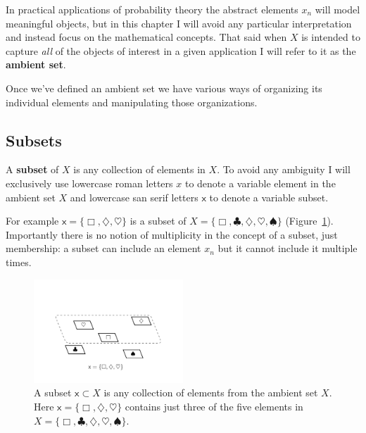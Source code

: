 \documentclass[
  letterpaper,
  DIV=11,
  numbers=noendperiod]{scrartcl}
\begin{document}
In practical applications of probability theory the abstract elements
\(x_{n}\) will model meaningful objects, but in this chapter I will
avoid any particular interpretation and instead focus on the
mathematical concepts. That said when \(X\) is intended to capture
\emph{all} of the objects of interest in a given application I will
refer to it as the \textbf{ambient set}.

Once we've defined an ambient set we have various ways of organizing its
individual elements and manipulating those organizations.

\hypertarget{subsets}{%
\subsection{Subsets}\label{subsets}}

A \textbf{subset} of \(X\) is any collection of elements in \(X\). To
avoid any ambiguity I will exclusively use lowercase roman letters \(x\)
to denote a variable element in the ambient set \(X\) and lowercase san
serif letters \(\mathsf{x}\) to denote a variable subset.

For example \(\mathsf{x} = \{\Box, \diamondsuit, \heartsuit\}\) is a
subset of
\(X = \{\Box, \clubsuit, \diamondsuit, \heartsuit, \spadesuit\}\)
(Figure~\ref{fig-subset}). Importantly there is no notion of
multiplicity in the concept of a subset, just membership: a subset can
include an element \(x_{n}\) but it cannot include it multiple times.

\begin{figure}

{\centering \includegraphics[width=0.5\textwidth,height=\textheight]{figures/subset/subset.pdf}

}

\caption{\label{fig-subset}A subset \(\mathsf{x} \subset X\) is any
collection of elements from the ambient set \(X\). Here
\(\mathsf{x} = \{\Box, \diamondsuit, \heartsuit\}\) contains just three
of the five elements in
\(X = \{\Box, \clubsuit, \diamondsuit, \heartsuit, \spadesuit\}\).}

\end{figure}
\end{document}
